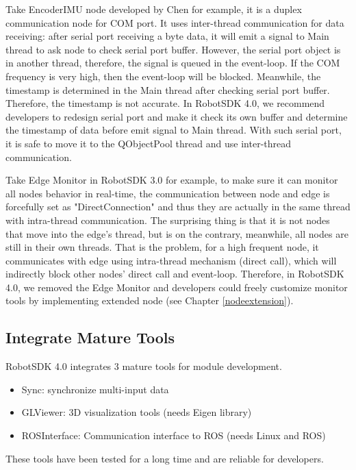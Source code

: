 \documentclass[a4paper,10pt]{book}
\begin{document}
Take EncoderIMU node developed by Chen for example, it is a duplex communication node for COM port. It uses inter-thread communication for data receiving: after serial port receiving a byte data, it will emit a signal to Main thread to ask node to check serial port buffer. However, the serial port object is in another thread, therefore, the signal is queued in the event-loop. If the COM frequency is very high, then the event-loop will be blocked. Meanwhile, the timestamp is determined in the Main thread after checking serial port buffer. Therefore, the timestamp is not accurate. In RobotSDK 4.0, we recommend developers to redesign serial port and make it check its own buffer and determine the timestamp of data before emit signal to Main thread. With such serial port, it is safe to move it to the QObjectPool thread and use inter-thread communication.

Take Edge Monitor in RobotSDK 3.0 for example, to make sure it can monitor all nodes behavior in real-time, the communication between node and edge is forcefully set as "DirectConnection" and thus they are actually in the same thread with intra-thread communication. The surprising thing is that it is not nodes that move into the edge's thread, but is on the contrary, meanwhile, all nodes are still in their own threads. That is the problem, for a high frequent node, it communicates with edge using intra-thread mechanism (direct call), which will indirectly block other nodes' direct call and event-loop. Therefore, in RobotSDK 4.0, we removed the Edge Monitor and developers could freely customize monitor tools by implementing extended node (see Chapter \ref{nodeextension}).

\subsection{Integrate Mature Tools}

RobotSDK 4.0 integrates 3 mature tools for module development.

\begin{itemize}
 \item Sync: synchronize multi-input data
 \item GLViewer: 3D visualization tools (needs Eigen library)
 \item ROSInterface: Communication interface to ROS (needs Linux and ROS)
\end{itemize}

These tools have been tested for a long time and are reliable for developers.
\end{document}
